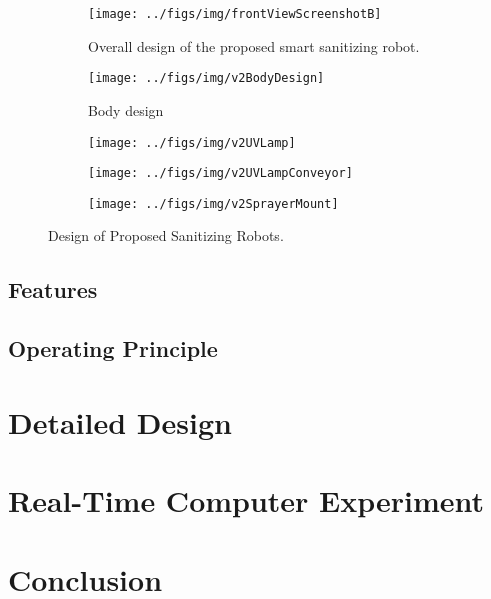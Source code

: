 \documentclass[letterpaper]{article} %
\begin{document}
\begin{figure}[htpb]
  \centering
  \begin{subfigure}[b]{0.5\textwidth}
    \centering
    \texttt{[image: ../figs/img/frontViewScreenshotB]}
    \caption{Overall design of the proposed smart sanitizing robot.}
    \label{fig:frontViewScreenshotB}
  \end{subfigure}
  \begin{subfigure}[b]{.5\textwidth}
    \centering
    \texttt{[image: ../figs/img/v2BodyDesign]}
    \caption{Body design}
  \end{subfigure}
  \begin{subfigure}[b]{.5\textwidth}
    \centering
    \texttt{[image: ../figs/img/v2UVLamp]}
  \end{subfigure}
  \begin{subfigure}[b]{.5\textwidth}
    \centering
    \texttt{[image: ../figs/img/v2UVLampConveyor]}
  \end{subfigure}
  \begin{subfigure}[b]{.5\textwidth}
    \centering
    \texttt{[image: ../figs/img/v2SprayerMount]}
  \end{subfigure}
  \caption{Design of Proposed Sanitizing Robots.}
  \label{fig:ArchitecturesOfSanitizingRobot}
\end{figure}


\subsection{Features}
\label{sec:Features}

\subsection{Operating Principle}
\label{sec:OperatingPrinciple}



\section{Detailed Design}
\label{sec:DetailedDesign}



\section{Real-Time Computer Experiment}
\label{sec:RealTimeComputerExperiment}


\section{Conclusion}
\label{sec:conclusion}


 
 
\end{document}
